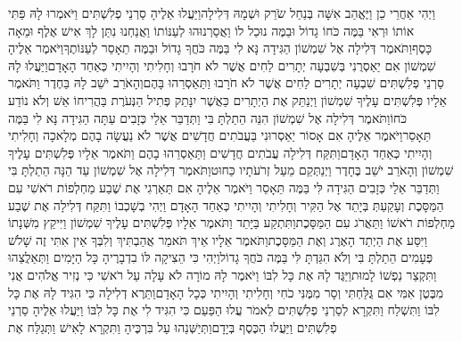 \documentclass[../main/main.tex]{subfiles}
\begin{document}
\begin{multicols*}{\ncols}
וַיְהִי אַחֲרֵי כֵן וַיֶּאֱהַב אִשָּׁה בְּנַחַל שֹׂרֵק וּשְׁמָהּ דְּלִילָה\PreVerseSpace{}וַיַּעֲלוּ אֵלֶיהָ סַרְנֵי פְלִשְׁתִּים וַיֹּאמְרוּ לָהּ פַּתִּי אוֹתוֹ וּרְאִי בַּמֶּה כֹּחוֹ גָדוֹל וּבַמֶּה נוּכַל לוֹ וַאֲסַרְנוּהוּ לְעַנּוֹתוֹ וַאֲנַחְנוּ נִתַּן לָךְ אִישׁ אֶלֶף וּמֵאָה כָּסֶף\PreVerseSpace{}וַתֹּאמֶר דְּלִילָה אֶל שִׁמְשׁוֹן הַגִּידָה נָּא לִי בַּמֶּה כֹּחֲךָ גָדוֹל וּבַמֶּה תֵאָסֵר לְעַנּוֹתֶךָ\PreVerseSpace{}וַיֹּאמֶר אֵלֶיהָ שִׁמְשׁוֹן אִם יַאַסְרֻנִי בְּשִׁבְעָה יְתָרִים לַחִים אֲשֶׁר לֹא חֹרָבוּ וְחָלִיתִי וְהָיִיתִי כְּאַחַד הָאָדָם\PreVerseSpace{}וַיַּעֲלוּ לָהּ סַרְנֵי פְלִשְׁתִּים שִׁבְעָה יְתָרִים לַחִים אֲשֶׁר לֹא חֹרָבוּ וַתַּאַסְרֵהוּ בָּהֶם\PreVerseSpace{}וְהָאֹרֵב יֹשֵׁב לָהּ בַּחֶדֶר וַתֹּאמֶר אֵלָיו פְּלִשְׁתִּים עָלֶיךָ שִׁמְשׁוֹן וַיְנַתֵּק אֶת הַיְתָרִים כַּאֲשֶׁר יִנָּתֵק פְּתִיל הַנְּעֹרֶת בַּהֲרִיחוֹ אֵשׁ וְלֹא נוֹדַע כֹּחוֹ\PreVerseSpace{}וַתֹּאמֶר דְּלִילָה אֶל שִׁמְשׁוֹן הִנֵּה הֵתַלְתָּ בִּי וַתְּדַבֵּר אֵלַי כְּזָבִים עַתָּה הַגִּידָה נָּא לִי בַּמֶּה תֵּאָסֵר\PreVerseSpace{}וַיֹּאמֶר אֵלֶיהָ אִם אָסוֹר יַאַסְרוּנִי בַּעֲבֹתִים חֲדָשִׁים אֲשֶׁר לֹא נַעֲשָׂה בָהֶם מְלָאכָה וְחָלִיתִי וְהָיִיתִי כְּאַחַד הָאָדָם\PreVerseSpace{}וַתִּקַּח דְּלִילָה עֲבֹתִים חֲדָשִׁים וַתַּאַסְרֵהוּ בָהֶם וַתֹּאמֶר אֵלָיו פְּלִשְׁתִּים עָלֶיךָ שִׁמְשׁוֹן וְהָאֹרֵב יֹשֵׁב בֶּחָדֶר וַיְנַתְּקֵם מֵעַל זְרֹעֹתָיו כַּחוּט\PreVerseSpace{}וַתֹּאמֶר דְּלִילָה אֶל שִׁמְשׁוֹן עַד הֵנָּה הֵתַלְתָּ בִּי וַתְּדַבֵּר אֵלַי כְּזָבִים הַגִּידָה לִּי בַּמֶּה תֵּאָסֵר וַיֹּאמֶר אֵלֶיהָ אִם תַּאַרְגִי אֶת שֶׁבַע מַחְלְפוֹת רֹאשִׁי עִם הַמַּסָּכֶת וְעָקַעַתְּ בְּיָתֵד אֶל הַקִּיר וְחָלִיתִי וְהָיִיתִי כְּאַחַד הָאָדָם וַיְהִי בְשָׁכְבוֹ וַתִּקַּח דְּלִילָה אֶת שֶׁבַע מַחְלְפוֹת רֹאשׁוֹ וַתַּאֲרֹג עִם הַמַּסָּכֶת\OmitEnd{}\PreVerseSpace{}וַתִּתְקַע בַּיָּתֵד וַתֹּאמֶר אֵלָיו פְּלִשְׁתִּים עָלֶיךָ שִׁמְשׁוֹן וַיִּיקַץ מִשְּׁנָתוֹ וַיִּסַּע אֶת הַיְתַד הָאֶרֶג וְאֶת הַמַּסָּכֶת\PreVerseSpace{}וַתֹּאמֶר אֵלָיו אֵיךְ תֹּאמַר אֲהַבְתִּיךְ וְלִבְּךָ אֵין אִתִּי זֶה שָׁלֹשׁ פְּעָמִים הֵתַלְתָּ בִּי וְלֹא הִגַּדְתָּ לִּי בַּמֶּה כֹּחֲךָ גָדוֹל\PreVerseSpace{}וַיְהִי כִּי הֵצִיקָה לּוֹ בִדְבָרֶיהָ כָּל הַיָּמִים וַתְּאַלֲצֵהוּ וַתִּקְצַר נַפְשׁוֹ לָמוּת\PreVerseSpace{}וַיַּגֶּד לָהּ אֶת כָּל לִבּוֹ וַיֹּאמֶר לָהּ מוֹרָה לֹא עָלָה עַל רֹאשִׁי כִּי נְזִיר אֱלֹהִים אֲנִי מִבֶּטֶן אִמִּי אִם גֻּלַּחְתִּי וְסָר מִמֶּנִּי כֹחִי וְחָלִיתִי וְהָיִיתִי כְּכָל הָאָדָם\PreVerseSpace{}וַתֵּרֶא דְלִילָה כִּי הִגִּיד לָהּ אֶת כָּל לִבּוֹ וַתִּשְׁלַח וַתִּקְרָא לְסַרְנֵי פְלִשְׁתִּים לֵאמֹר עֲלוּ הַפַּעַם כִּי הִגִּיד לִי\SubEnd{} אֶת כָּל לִבּוֹ וַיַּעֲלוּ\SubEnd{} אֵלֶיהָ סַרְנֵי פְלִשְׁתִּים וַיַּעֲלוּ הַכֶּסֶף בְּיָדָם\PreVerseSpace{}וַתְּיַשְּׁנֵהוּ עַל בִּרְכֶּיהָ וַתִּקְרָא לָאִישׁ וַתְּגַלַּח אֶת 
\end{multicols*}
\end{document}
